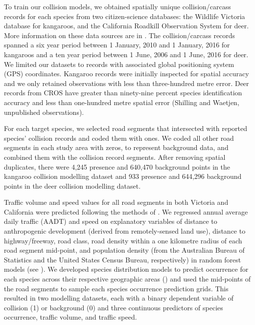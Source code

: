 To train our collision models, we obtained spatially unique collision/carcass records for each species from two citizen-science databases: the Wildlife Victoria database for kangaroos, and the California Roadkill Observation System \citep[CROS, see][]{shil15a} for deer. More information on these data sources are in . The collision/carcass records spanned a six year period between 1 January, 2010 and 1 January, 2016 for kangaroos and a ten year period between 1 June, 2006 and 1 June, 2016 for deer. We limited our datasets to records with associated global positioning system (GPS) coordinates. Kangaroo records were initially inspected for spatial accuracy and we only retained observations with less than three-hundred metre error. Deer records from CROS have greater than ninety-nine percent species identification accuracy and less than one-hundred metre spatial error (Shilling and Waetjen, unpublished observations).

For each target species, we selected road segments that intersected with reported species' collision records and coded them with ones. We coded all other road segments in each study area with zeros, to represent background data, and combined them with the collision record segments.  After removing spatial duplicates, there were 4,245 presence and 640,470 background points in the kangaroo collision modelling dataset and 933 presence and 644,296 background points in the deer collision modelling dataset.

Traffic volume and speed values for all road segments in both Victoria and California were predicted following the methods of .  We regressed annual average daily traffic (AADT) and speed on explanatory variables of distance to anthropogenic development (derived from remotely-sensed land use), distance to highway/freeway, road class, road density within a one kilometre radius of each road segment mid-point, and population density (from the Australian Bureau of Statistics and the United States Census Bureau, respectively) in random forest models \citep[see][]{brei01} (see ). We developed species distribution models to predict occurrence for each species across their respective geographic areas () and used the mid-points of the road segments to sample each species occurrence prediction grids. This resulted in two modelling datasets, each with a binary dependent variable of collision (1) or background (0) and three continuous predictors of species occurrence, traffic volume, and traffic speed.  

